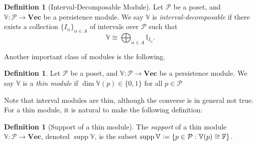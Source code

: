 \documentclass[a4paper,UKenglish,thm-restate]{article}
\theoremstyle{definition}
\newtheorem{definition}[theorem]{Definition}
\def\bbv{\mathbb{V}}
\def\bvec{\mathbf{Vec}}
\DeclareMathOperator{\supp}{supp}
\newcommand{\defeq}{\vcentcolon=}
\begin{document}
    \begin{definition}[Interval-Decomposable Module]
        Let $\mathcal{P}$ be a poset, and $\bbv: \mathcal{P} \rightarrow \bvec$ be a persistence module. We say $\bbv$ is \textit{interval-decomposable} if there exists a collection $\{I_\alpha\}_{\alpha \in A}$ of intervals over $\mathcal{P}$ such that \[\bbv \cong \bigoplus_{\alpha \in A} \mathbb{I}_{I_\alpha}.\]
    \end{definition}
    
    Another important class of modules is the following.
    \begin{definition} \label{def:thinmodule}
        Let $\mathcal{P}$ be a poset, and $\bbv: \mathcal{P} \rightarrow \bvec$ be a persistence module. We say $\bbv$ is a \emph{thin module} if $\dim \bbv(p) \in \{0, 1\}$ for all $p \in \mathcal{P}$
    \end{definition}

    Note that interval modules are thin, although the converse is in general not true. For a thin module, it is natural to make the following definition:
    \begin{definition}[Support of a thin module]
        The \emph{support} of a thin module $\bbv: \mathcal{P} \rightarrow \bvec$, denoted $\supp \bbv$, is the subset $\supp \bbv \defeq \{ p \in \mathcal{P} : \bbv(p) \cong \mathbb{F} \}$.
    \end{definition}
\end{document}

